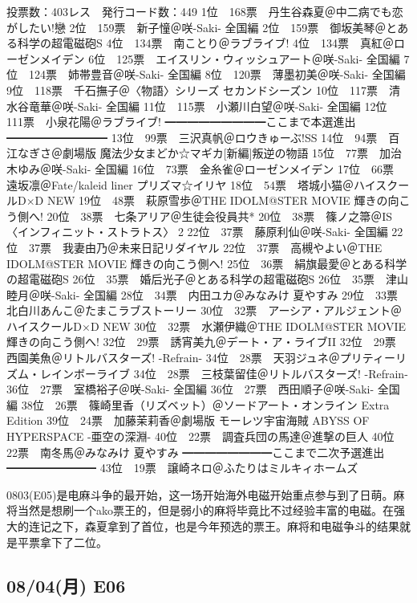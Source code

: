	投票数：403レス　発行コード数：449
	1位　168票　丹生谷森夏＠中二病でも恋がしたい!戀
	2位　159票　新子憧＠咲-Saki- 全国編
	2位　159票　御坂美琴＠とある科学の超電磁砲S
	4位　134票　南ことり＠ラブライブ!
	4位　134票　真紅＠ローゼンメイデン
	6位　125票　エイスリン・ウィッシュアート＠咲-Saki- 全国編
	7位　124票　姉帯豊音＠咲-Saki- 全国編
	8位　120票　薄墨初美＠咲-Saki- 全国編
	9位　118票　千石撫子＠〈物語〉シリーズ セカンドシーズン
	10位　117票　清水谷竜華＠咲-Saki- 全国編
	11位　115票　小瀬川白望＠咲-Saki- 全国編
	12位　111票　小泉花陽＠ラブライブ!
	━━━━━━━━━ここまで本選進出━━━━━━━━━
	13位　99票　三沢真帆＠ロウきゅーぶ!SS
	14位　94票　百江なぎさ＠劇場版 魔法少女まどか☆マギカ[新編]叛逆の物語
	15位　77票　加治木ゆみ＠咲-Saki- 全国編
	16位　73票　金糸雀＠ローゼンメイデン
	17位　66票　遠坂凛＠Fate/kaleid liner プリズマ☆イリヤ
	18位　54票　塔城小猫＠ハイスクールD×D NEW
	19位　48票　萩原雪歩＠THE IDOLM@STER MOVIE 輝きの向こう側へ!
	20位　38票　七条アリア＠生徒会役員共*
	20位　38票　篠ノ之箒＠IS〈インフィニット・ストラトス〉 2
	22位　37票　藤原利仙＠咲-Saki- 全国編
	22位　37票　我妻由乃＠未来日記リダイヤル
	22位　37票　高槻やよい＠THE IDOLM@STER MOVIE 輝きの向こう側へ!
	25位　36票　絹旗最愛＠とある科学の超電磁砲S
	26位　35票　婚后光子＠とある科学の超電磁砲S
	26位　35票　津山睦月＠咲-Saki- 全国編
	28位　34票　内田ユカ＠みなみけ 夏やすみ
	29位　33票　北白川あんこ＠たまこラブストーリー
	30位　32票　アーシア・アルジェント＠ハイスクールD×D NEW
	30位　32票　水瀬伊織＠THE IDOLM@STER MOVIE 輝きの向こう側へ!
	32位　29票　誘宵美九＠デート・ア・ライブII
	32位　29票　西園美魚＠リトルバスターズ! -Refrain-
	34位　28票　天羽ジュネ＠プリティーリズム・レインボーライブ
	34位　28票　三枝葉留佳＠リトルバスターズ! -Refrain-
	36位　27票　室橋裕子＠咲-Saki- 全国編
	36位　27票　西田順子＠咲-Saki- 全国編
	38位　26票　篠崎里香（リズベット）＠ソードアート・オンライン Extra Edition
	39位　24票　加藤茉莉香＠劇場版 モーレツ宇宙海賊 ABYSS OF HYPERSPACE -亜空の深淵-
	40位　22票　調査兵団の馬達＠進撃の巨人
	40位　22票　南冬馬＠みなみけ 夏やすみ
	━━━━━━━━ここまで二次予選進出━━━━━━━━
	43位　19票　譲崎ネロ＠ふたりはミルキィホームズ

0803(E05)是电麻斗争的最开始，这一场开始海外电磁开始重点参与到了日萌。麻将当然是想刷一个ako票王的，但是弱小的麻将毕竟比不过经验丰富的电磁。在强大的连记之下，森夏拿到了首位，也是今年预选的票王。麻将和电磁争斗的结果就是平票拿下了二位。

\subsection{08/04(月) E06}

